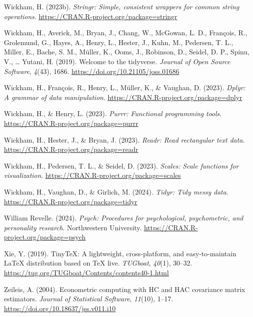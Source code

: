 \documentclass[
  man,floatsintext]{apa7}
\newlength{\cslhangindent}
\newlength{\cslentryspacingunit} %
\newenvironment{CSLReferences}[2] %
 {%
  \setlength{\parindent}{0pt}
  \ifodd #1
  \let\oldpar\par
  \def\par{\hangindent=\cslhangindent\oldpar}
  \fi
  \setlength{\parskip}{#2\cslentryspacingunit}
 }%
 {}
\begin{document}
\begin{CSLReferences}{1}{0}
\leavevmode{}%
Wickham, H. (2023b). \emph{Stringr: Simple, consistent wrappers for common string operations}. \url{https://CRAN.R-project.org/package=stringr}

\leavevmode{}%
Wickham, H., Averick, M., Bryan, J., Chang, W., McGowan, L. D., François, R., Grolemund, G., Hayes, A., Henry, L., Hester, J., Kuhn, M., Pedersen, T. L., Miller, E., Bache, S. M., Müller, K., Ooms, J., Robinson, D., Seidel, D. P., Spinu, V., \ldots{} Yutani, H. (2019). Welcome to the {tidyverse}. \emph{Journal of Open Source Software}, \emph{4}(43), 1686. \url{https://doi.org/10.21105/joss.01686}

\leavevmode{}%
Wickham, H., François, R., Henry, L., Müller, K., \& Vaughan, D. (2023). \emph{Dplyr: A grammar of data manipulation}. \url{https://CRAN.R-project.org/package=dplyr}

\leavevmode{}%
Wickham, H., \& Henry, L. (2023). \emph{Purrr: Functional programming tools}. \url{https://CRAN.R-project.org/package=purrr}

\leavevmode{}%
Wickham, H., Hester, J., \& Bryan, J. (2023). \emph{Readr: Read rectangular text data}. \url{https://CRAN.R-project.org/package=readr}

\leavevmode{}%
Wickham, H., Pedersen, T. L., \& Seidel, D. (2023). \emph{Scales: Scale functions for visualization}. \url{https://CRAN.R-project.org/package=scales}

\leavevmode{}%
Wickham, H., Vaughan, D., \& Girlich, M. (2024). \emph{Tidyr: Tidy messy data}. \url{https://CRAN.R-project.org/package=tidyr}

\leavevmode{}%
William Revelle. (2024). \emph{Psych: Procedures for psychological, psychometric, and personality research}. Northwestern University. \url{https://CRAN.R-project.org/package=psych}

\leavevmode{}%
Xie, Y. (2019). TinyTeX: A lightweight, cross-platform, and easy-to-maintain LaTeX distribution based on TeX live. \emph{TUGboat}, \emph{40}(1), 30--32. \url{https://tug.org/TUGboat/Contents/contents40-1.html}

\leavevmode{}%
Zeileis, A. (2004). Econometric computing with {HC} and {HAC} covariance matrix estimators. \emph{Journal of Statistical Software}, \emph{11}(10), 1--17. \url{https://doi.org/10.18637/jss.v011.i10}


\end{CSLReferences}
\end{document}
